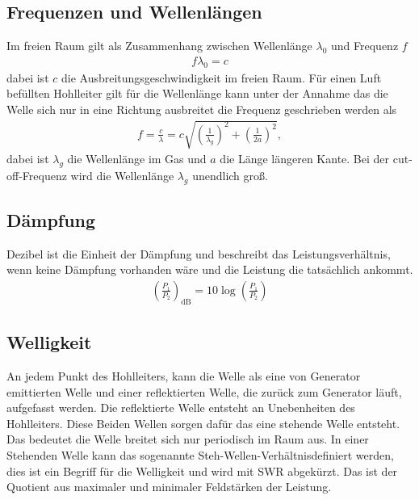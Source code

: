 \subsection{Frequenzen und Wellenlängen}
Im freien Raum gilt als Zusammenhang zwischen Wellenlänge $\lambda_0$ und Frequenz $f$
\begin{align}
	f\lambda_0=c
\end{align}
dabei ist $c$ die Ausbreitungsgeschwindigkeit im freien Raum. Für einen Luft befüllten Hohlleiter gilt für die Wellenlänge kann unter der Annahme das die Welle sich nur in eine Richtung ausbreitet die Frequenz geschrieben werden als 
\begin{align}
	f=	\frac{c}{\lambda}=c \sqrt{ \left( \frac{1}{\lambda_g} \right)^2 + \left( \frac{1}{2a} \right) ^2 },
\end{align}
dabei ist $\lambda_g$ die Wellenlänge im Gas und $a$ die Länge längeren Kante. Bei der cut-off-Frequenz wird die Wellenlänge $\lambda_g$ unendlich groß.
\subsection{Dämpfung}
Dezibel ist die Einheit der Dämpfung und beschreibt das Leistungsverhältnis, wenn keine Dämpfung vorhanden wäre und die Leistung die tatsächlich ankommt.
\begin{align}
	\left( \frac{P_1}{P_2} \right)_\text{dB}=10\log\left( \frac{P_1}{P_2}\right)
\end{align}

\subsection{Welligkeit}
An jedem Punkt des Hohlleiters, kann die Welle als eine von Generator emittierten Welle und einer reflektierten Welle, die zurück zum Generator läuft, aufgefasst werden. Die reflektierte Welle entsteht an Unebenheiten des Hohlleiters. Diese Beiden Wellen sorgen dafür das eine stehende Welle entsteht. Das bedeutet die Welle breitet sich nur periodisch im Raum aus. In einer Stehenden Welle kann das sogenannte \glqq Steh-Wellen-Verhältnis\grqq definiert werden, dies ist ein Begriff für die Welligkeit und wird mit SWR abgekürzt. Das ist der Quotient aus maximaler und minimaler Feldstärken der Leistung.
